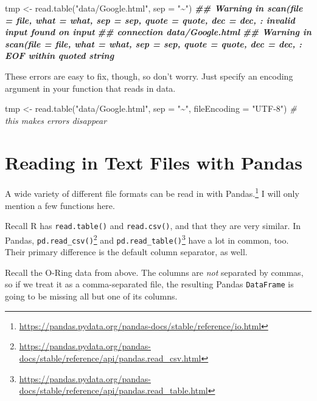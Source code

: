 \documentclass[
  12pt,
  krantz2]{krantz}
\makeatletter
\newenvironment{Shaded}{\begin{snugshade}}{\end{snugshade}}
\newcommand{\AttributeTok}[1]{\textcolor[rgb]{0.61,0.61,0.61}{#1}}
\newcommand{\CommentTok}[1]{\textcolor[rgb]{0.37,0.37,0.37}{\textit{#1}}}
\newcommand{\DocumentationTok}[1]{\textcolor[rgb]{0.37,0.37,0.37}{\textbf{\textit{#1}}}}
\newcommand{\FunctionTok}[1]{\textcolor[rgb]{0,0,0}{#1}}
\newcommand{\NormalTok}[1]{#1}
\newcommand{\OtherTok}[1]{\textcolor[rgb]{0.37,0.37,0.37}{#1}}
\newcommand{\StringTok}[1]{\textcolor[rgb]{0.5,0.5,0.5}{#1}}
\renewcommand{\href}[2]{#2\footnote{\url{#1}}}
\newenvironment{kframe}{%
\medskip{}
\setlength{\fboxsep}{.8em}
 \def\at@end@of@kframe{}%
 \ifinner\ifhmode%
  \def\at@end@of@kframe{\end{minipage}}%
  \begin{minipage}{\columnwidth}%
 \fi\fi%
 \def\FrameCommand##1{\hskip\@totalleftmargin \hskip-\fboxsep
 \colorbox{shadecolor}{##1}\hskip-\fboxsep
     \hskip-\linewidth \hskip-\@totalleftmargin \hskip\columnwidth}%
 \MakeFramed {\advance\hsize-\width
   \@totalleftmargin\z@ \linewidth\hsize
   \@setminipage}}%
 {\par\unskip\endMakeFramed%
 \at@end@of@kframe}
\renewenvironment{Shaded}{\begin{kframe}}{\end{kframe}}
\makeatother
\begin{document}
\begin{Shaded}
\begin{Highlighting}[]
\NormalTok{tmp }\OtherTok{\textless{}{-}} \FunctionTok{read.table}\NormalTok{(}\StringTok{"data/Google.html"}\NormalTok{, }\AttributeTok{sep =} \StringTok{"\textasciitilde{}"}\NormalTok{)}
\DocumentationTok{\#\# Warning in scan(file = file, what = what, sep = sep, quote = quote, dec = dec, : invalid input found on input}
\DocumentationTok{\#\# connection \textquotesingle{}data/Google.html\textquotesingle{}}
\DocumentationTok{\#\# Warning in scan(file = file, what = what, sep = sep, quote = quote, dec = dec, : EOF within quoted string}
\end{Highlighting}
\end{Shaded}

These errors are easy to fix, though, so don't worry. Just specify an encoding argument in your function that reads in data.

\begin{Shaded}
\begin{Highlighting}[]
\NormalTok{tmp }\OtherTok{\textless{}{-}} \FunctionTok{read.table}\NormalTok{(}\StringTok{"data/Google.html"}\NormalTok{, }\AttributeTok{sep =} \StringTok{"\textasciitilde{}"}\NormalTok{, }
                  \AttributeTok{fileEncoding =} \StringTok{"UTF{-}8"}\NormalTok{) }\CommentTok{\# this makes errors disappear}
\end{Highlighting}
\end{Shaded}

\hypertarget{reading-in-text-files-with-pandas}{%
\section{Reading in Text Files with Pandas}\label{reading-in-text-files-with-pandas}}

A \href{https://pandas.pydata.org/pandas-docs/stable/reference/io.html}{wide variety of different file formats can be read in with Pandas.} I will only mention a few functions here.

Recall R has \texttt{read.table()} and \texttt{read.csv()}, and that they are very similar. In Pandas, \href{https://pandas.pydata.org/pandas-docs/stable/reference/api/pandas.read_csv.html}{\texttt{pd.read\_csv()}} and \href{https://pandas.pydata.org/pandas-docs/stable/reference/api/pandas.read_table.html}{\texttt{pd.read\_table()}} have a lot in common, too. Their primary difference is the default column separator, as well.

Recall the O-Ring data from above. The columns are \emph{not} separated by commas, so if we treat it as a comma-separated file, the resulting Pandas \texttt{DataFrame} is going to be missing all but one of its columns.
\end{document}
